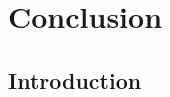 \documentclass[a4paper,11pt,final]{ThesisStyle}
\newenvironment{abstract}{\rightskip1in\itshape}{}
\begin{document}

\chapter{Conclusion}
\minitoc

\begin{abstract}

\end{abstract}

\section{Introduction}








\appendix



\end{document}
